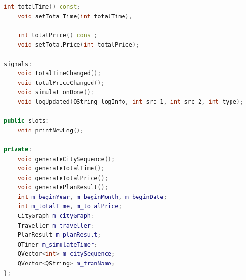 \documentclass[lang=cn,blue]{elegantbook}
\begin{document}
\begin{lstlisting}[language=C++,caption={GraphHandler 的定义},captionpos=b]
	int totalTime() const;
	void setTotalTime(int totalTime);

	int totalPrice() const;
	void setTotalPrice(int totalPrice);

signals:
	void totalTimeChanged();
	void totalPriceChanged();
	void simulationDone();
	void logUpdated(QString logInfo, int src_1, int src_2, int type);

public slots:
	void printNewLog();

private:
	void generateCitySequence();
	void generateTotalTime();
	void generateTotalPrice();
	void generatePlanResult();
	int m_beginYear, m_beginMonth, m_beginDate;
	int m_totalTime, m_totalPrice;
	CityGraph m_cityGraph;
	Traveller m_traveller;
	PlanResult m_planResult;
	QTimer m_simulateTimer;
	QVector<int> m_citySequence;
	QVector<QString> m_tranName;
};
\end{lstlisting}
\end{document}

